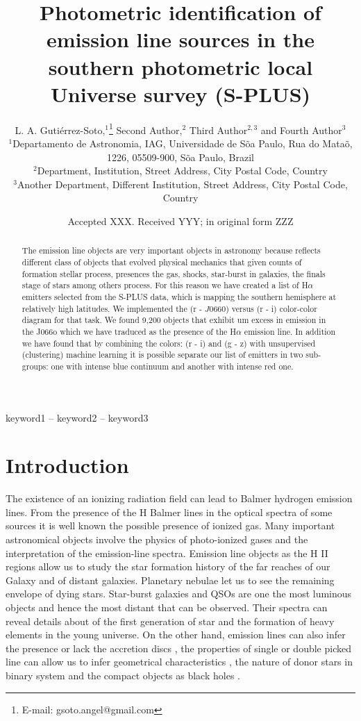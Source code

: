 \documentclass[fleqn,usenatbib]{mnras}
\title[S-PLUS: Emission line objects]{Photometric identification of emission line sources in the southern photometric local Universe survey (S-PLUS)}
\author[Guti\'{e}rrez-Soto et al.]{
L. A. Guti\'{e}rrez-Soto,$^{1}$\thanks{E-mail: gsoto.angel@gmail.com}
Second  Author,$^{2}$
Third Author$^{2,3}$
and Fourth Author$^{3}$
\\
$^{1}$Departamento de Astronomia, IAG, Universidade de S\~{o}a Paulo, Rua do Mata\~{o}, 1226, 05509-900, S\~{o}a Paulo, Brazil\\
$^{2}$Department, Institution, Street Address, City Postal Code, Country\\
$^{3}$Another Department, Different Institution, Street Address, City Postal Code, Country
}
\date{Accepted XXX. Received YYY; in original form ZZZ}
\begin{document}
\label{firstpage}
\pagerange{\pageref{firstpage}--\pageref{lastpage}}
\maketitle

\begin{abstract}
The emission line objects are very important objects in astronomy because reflects different class of objects that evolved physical mechanics that given counts of formation stellar process, presences the gas, shocks, star-burst in galaxies, the finals stage of stars among others process. For this reason we have created a list of H{$\alpha$} emitters selected from the S-PLUS data, which is mapping the southern hemisphere at relatively high latitudes. We implemented the (r - $J$0660) versus (r - i) color-color diagram for that task. We found 9,200 objects that exhibit um excess in emission in the J066o which we have traduced as the presence of the H{$\alpha$} emission line. In addition we have found that by combining the colors: (r - i) and (g - z) with unsupervised (clustering) machine learning it is possible separate our list of emitters in two sub-groups: one with intense blue continuum and another with intense red one.  
\end{abstract}
\begin{keywords}
keyword1 -- keyword2 -- keyword3
\end{keywords}



\section{Introduction}

The existence of an ionizing radiation field can lead to Balmer hydrogen emission lines. From the presence  of the H Balmer lines in the optical spectra of some sources it is well known the possible presence of ionized gas. Many important astronomical objects involve the physics of photo-ionized gases and the interpretation of the emission-line spectra. Emission line objects as the H II regions allow us to study the star formation history of the far reaches of our Galaxy and of distant galaxies. Planetary nebulae let us to see the remaining envelope of dying stars. Star-burst galaxies and QSOs are one the most luminous objects and hence the most distant that can be observed. Their spectra can reveal details about of the first generation of star and the formation of heavy elements in the young universe. On the other hand, emission lines can also infer the presence or lack the accretion discs \citep{Schwope:2000, Ratti:2012}, the properties of single or double picked line can allow us to infer geometrical characteristics \citep{Horne:1986}, the nature of  donor stars in binary system \citep{Steeghs:2002, Spaandonk:2010, Casares:2015} and the compact objects as black holes \citep{Casares:2016}. 
\end{document}
